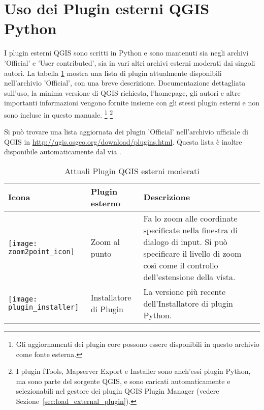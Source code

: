 
\section{Uso dei Plugin esterni QGIS Python}\label{sec:external_plugins}


I plugin esterni QGIS sono scritti in Python e sono mantenuti sia
negli archivi 'Official' e 'User contributed', sia in vari altri archivi esterni 
moderati dai singoli autori. 
La tabella \ref{tab:external_plugins} mostra una lista di plugin attualmente disponibili nell'archivio 'Official', 
con una breve descrizione.
Documentazione dettagliata sull'uso, la minima versione di QGIS richiesta, l'homepage, gli autori 
e altre importanti informazioni vengono fornite insieme con gli stessi plugin esterni 
e non sono incluse in questo manuale.
\footnote{Gli aggiornamenti dei plugin core possono essere
disponibili in questo archivio come fonte esterna.} 
\footnote{I plugin fTools, Mapserver Export e Installer sono anch'essi plugin Python, 
ma sono parte del sorgente QGIS, e sono caricati automaticamente e selezionabili nel gestore dei 
plugin QGIS Plugin Manager (vedere Sezione~\ref{sec:load_external_plugin}).}

Si può trovare una lista aggiornata dei plugin 'Official' nell'archivio ufficiale di QGIS 
in \url{http://qgis.osgeo.org/download/plugins.html}. Questa lista è inoltre disponibile 
automaticamente dal  via . 

\begin{table}[H]
\centering
\caption{Attuali Plugin QGIS esterni moderati}\label{tab:external_plugins}\medskip
\small
 \begin{tabular}{|l|l|p{4in}|}
\hline \textbf{Icona} & \textbf{Plugin esterno} & \textbf{Descrizione}\\
\hline
\texttt{[image: zoom2point\_icon]}
 & Zoom al punto \index{plugin!zoom al punto} & Fa lo zoom alle coordinate 
specificate nella finestra di dialogo di input. Si può specificare il livello di zoom così come 
il controllo dell'estensione della vista.\\
\hline
\texttt{[image: plugin\_installer]}
 & Installatore di Plugin \index{plugins!installatore plugin Python} & La versione più recente dell'Installatore di plugin Python.\\
\hline

\end{tabular}
\end{table}

